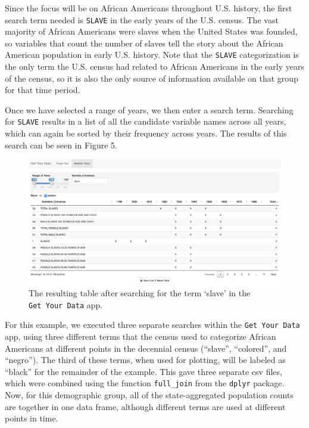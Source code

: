 \documentclass[11pt,]{article}
\begin{document}
Since the focus will be on African Americans throughout U.S. history,
the first search term needed is \texttt{SLAVE} in the early years of the
U.S. census. The vast majority of African Americans were slaves when the
United States was founded, so variables that count the number of slaves
tell the story about the African American population in early U.S.
history. Note that the \texttt{SLAVE} categorization is the only term
the U.S. census had related to African Americans in the early years of
the census, so it is also the only source of information available on
that group for that time period.

Once we have selected a range of years, we then enter a search term.
Searching for \texttt{SLAVE} results in a list of all the candidate
variable names across all years, which can again be sorted by their
frequency across years. The results of this search can be seen in Figure
5.

\begin{figure}[htbp]
\centering
\includegraphics{./figures/app-sshot-slave.png}
\caption{The resulting table after searching for the term `slave' in the
\texttt{Get\ Your\ Data} app.}
\end{figure}

For this example, we executed three separate searches within the
\texttt{Get\ Your\ Data} app, using three different terms that the
census used to categorize African Americans at different points in the
decennial census (``slave'', ``colored'', and ``negro''). The third of
these terms, when used for plotting, will be labeled as ``black'' for
the remainder of the example. This gave three separate csv files, which
were combined using the function \texttt{full\_join} from the
\texttt{dplyr} package. Now, for this demographic group, all of the
state-aggregated population counts are together in one data frame,
although different terms are used at different points in time.
\end{document}
